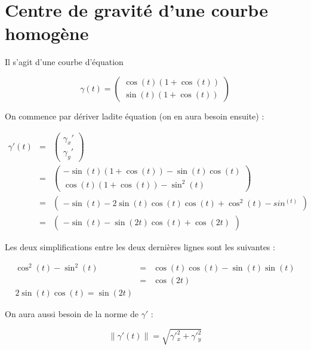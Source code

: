 \documentclass[a4paper, 11pt]{report} %
\begin{document}
\section{Centre de gravité d'une courbe homogène} %

Il s'agit d'une courbe d'équation 

\begin{equation}
    \gamma(t) = 
    \begin{pmatrix}
        \cos(t)(1+\cos(t))\\
        \sin(t)(1+\cos(t))
    \end{pmatrix}
\end{equation}

On commence par dériver ladite équation (on en aura besoin ensuite) :

\begin{eqnarray*}
\gamma'(t) & = &
        \begin{pmatrix}
            \gamma_x'\\
            \gamma_y'
        \end{pmatrix}\\
& = &   \begin{pmatrix}
            -\sin(t)(1+\cos(t))-\sin(t)\cos(t)\\
            \cos(t)(1+\cos(t)) - \sin^2(t)
        \end{pmatrix}\\
& = &   \begin{pmatrix}
            -\sin(t) - 2\sin(t)\cos(t)
            \cos(t)+\cos^2(t)-sin^(t)
        \end{pmatrix}\\
& = &   \begin{pmatrix}
            -\sin(t) - \sin(2t)
            \cos(t) +\cos(2t)
        \end{pmatrix}
\end{eqnarray*}

Les deux simplifications entre les deux dernières lignes sont les suivantes :

\begin{eqnarray*}
    \cos^2(t)-\sin^2(t) & = & \cos(t)\cos(t)-\sin(t)\sin(t)\\
    & = & \cos(2t)\\
    2\sin(t)\cos(t) = \sin(2t)
\end{eqnarray*}

On aura aussi besoin de la norme de $\gamma'$ :

\[
    \lVert\gamma'(t)\rVert = \sqrt{\gamma'^2_x + \gamma'^2_y}
\]
\end{document}
